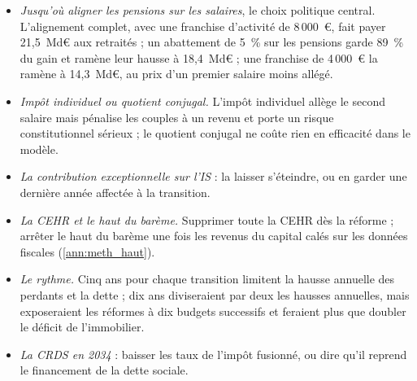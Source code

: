 \begin{itemize}\setlength{\itemsep}{1pt}
\item \emph{Jusqu'où aligner les pensions sur les salaires}, le choix politique central. L'alignement complet, avec une
franchise d'activité de 8\,000~€, fait payer 21,5~Md€ aux retraités ; un abattement de 5~\% sur les pensions garde
89~\% du gain et ramène leur hausse à 18,4~Md€ ; une franchise de 4\,000~€ la ramène à 14,3~Md€, au prix d'un premier
salaire moins allégé.
\item \emph{Impôt individuel ou quotient conjugal.} L'impôt individuel allège le second salaire mais pénalise les couples
à un revenu et porte un risque constitutionnel sérieux ; le quotient conjugal ne coûte rien en efficacité dans le
modèle.
\item \emph{La contribution exceptionnelle sur l'IS} : la laisser s'éteindre, ou en garder une dernière année affectée à
la transition.
\item \emph{La CEHR et le haut du barème.} Supprimer toute la CEHR dès la réforme ; arrêter le haut du barème une fois
les revenus du capital calés sur les données fiscales (\ref{ann:meth_haut}).
\item \emph{Le rythme.} Cinq ans pour chaque transition limitent la hausse annuelle des perdants et la dette ; dix ans
diviseraient par deux les hausses annuelles, mais exposeraient les réformes à dix budgets successifs et feraient plus
que doubler le déficit de l'immobilier.
\item \emph{La CRDS en 2034} : baisser les taux de l'impôt fusionné, ou dire qu'il reprend le financement de la dette
sociale.
\end{itemize}
